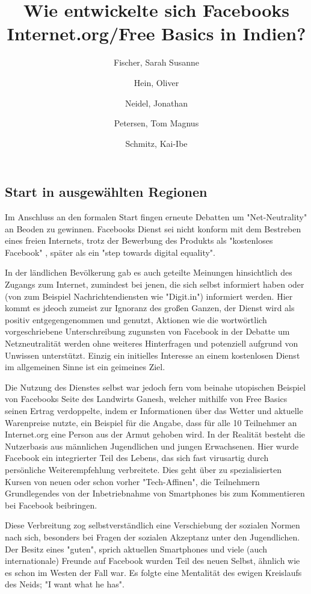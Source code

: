 \documentclass{article}
\title{Wie entwickelte sich Facebooks Internet.org/Free Basics in Indien?}
\author{
  Fischer, Sarah Susanne\\
  \and
  Hein, Oliver\\
  \and
  Neidel, Jonathan\\
  \and
  Petersen, Tom Magnus\\
  \and
  Schmitz, Kai-Ibe\\
}
\begin{document}
\maketitle
\subsection{Start in ausgewählten Regionen}

Im Anschluss an den formalen Start fingen erneute Debatten um "Net-Neutrality" an Beoden zu gewinnen. Facebooks Dienst sei nicht konform mit dem Bestreben eines freien Internets, trotz der Bewerbung des Produkts als "kostenloses Facebook"%
 , später als ein "step towards digital equality".

\medskip

In der ländlichen Bevölkerung gab es auch geteilte Meinungen hinsichtlich des Zugangs zum Internet, zumindest bei jenen, die sich selbst informiert haben oder (von zum Beispiel Nachrichtendiensten wie "Digit.in") %
informiert werden. Hier kommt es jdeoch zumeist zur Ignoranz des großen Ganzen, der Dienst wird als positiv entgegengenommen und genutzt, Aktionen wie die wortwörtlich vorgeschriebene Unterschreibung zugunsten von Facebook in der Debatte um Netzneutralität %
werden ohne weiteres Hinterfragen und potenziell aufgrund von Unwissen unterstützt. Einzig ein initielles Interesse an einem kostenlosen Dienst im allgemeinen Sinne ist ein geimeines Ziel.

\medskip

Die Nutzung des Dienstes selbst war jedoch fern vom beinahe utopischen Beispiel von Facebooks Seite des Landwirts Ganesh, welcher mithilfe von Free Basics seinen Ertrag verdoppelte, indem er Informationen über das Wetter und aktuelle Warenpreise nutzte, ein Beispiel für die Angabe, dass für alle 10 Teilnehmer an Internet.org eine Person aus der Armut gehoben wird. %
In der Realität besteht die Nutzerbasis aus männlichen Jugendlichen und jungen Erwachsenen. Hier wurde Facebook ein integrierter Teil des Lebens, das sich fast virusartig durch persönliche Weiterempfehlung verbreitete. Dies geht über zu spezialisierten Kursen von neuen oder schon vorher "Tech-Affinen", die Teilnehmern Grundlegendes von der Inbetriebnahme von Smartphones bis zum Kommentieren bei Facebook beibringen.

\medskip

Diese Verbreitung zog selbstverständlich eine Verschiebung der sozialen Normen nach sich, besonders bei Fragen der sozialen Akzeptanz unter den Jugendlichen. Der Besitz eines "guten", sprich aktuellen Smartphones und viele (auch internationale) Freunde auf Facebook wurden Teil des neuen Selbst, ähnlich wie es schon im Westen der Fall war. Es folgte eine Mentalität des ewigen Kreislaufs des Neids; "I want what he has".
\end{document}
